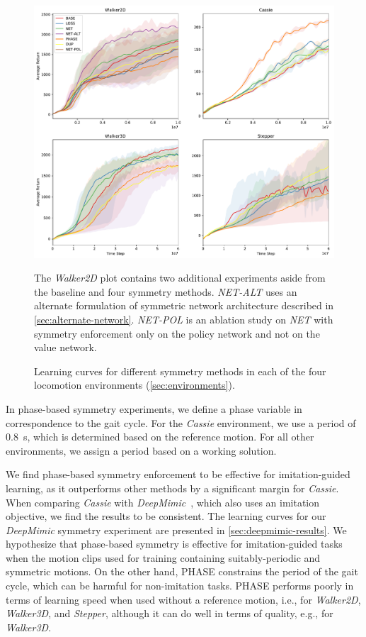 \begin{figure}[tbh]
  \centering
  \includegraphics[width=\columnwidth]{symmetry_figures/LearningCurves.pdf}
      \caption{Learning curves for different symmetry methods in each of the four locomotion environments (\autoref{sec:environments}).}{The \textit{Walker2D} plot contains two additional experiments aside from the baseline and four symmetry methods.  \textit{NET-ALT} uses an alternate formulation of symmetric network architecture described in \autoref{sec:alternate-network}.  \textit{NET-POL} is an ablation study on \textit{NET} with symmetry enforcement only on the policy network and not on the value network.}
  \label{fig:learning-curves}
\end{figure}

  In phase-based symmetry experiments, 
we define a phase variable in correspondence to the gait cycle.  
For the \textit{Cassie} environment, we use a period of 0.8~s, 
which is determined based on the reference motion.  
For all other environments, we assign a period based on a working solution.

We find phase-based symmetry enforcement to be effective for imitation-guided learning, 
as it outperforms other methods by a significant margin for \textit{Cassie}.  
When comparing \textit{Cassie} with \textit{DeepMimic}~\cite{2018-TOG-deepMimic}, 
which also uses an imitation objective, we find the results to be consistent.  
The learning curves for our \textit{DeepMimic} symmetry experiment are presented in \autoref{sec:deepmimic-results}.  
We hypothesize that phase-based symmetry is effective for imitation-guided tasks when
the motion clips used for training containing suitably-periodic and symmetric motions.  
On the other hand, PHASE constrains the period of the gait cycle, 
which can be harmful for non-imitation tasks. 
PHASE performs poorly in terms of learning speed 
when used without a reference motion, i.e., 
for \textit{Walker2D}, \textit{Walker3D}, and \textit{Stepper}, although
it can do well in terms of quality, e.g., for \textit{Walker3D}.

